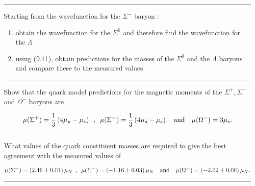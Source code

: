 \noindent\rule{7in}{1.5pt}


\begin{problem}{9.8}
Starting from the wavefunction for the $\Sigma^-$ baryon :

\begin{enumerate}[label=(\alph*)]
    \item obtain the wavefunction for the $\Sigma^0$ and therefore find the wavefunction for the $\Lambda$
    \item using (9.41), obtain predictions for the masses of the $\Sigma^0$ and the $\Lambda$ baryons and compare these to the measured values.
\end{enumerate}
\end{problem}
\begin{solution}

\end{solution}

\noindent\rule{7in}{1.5pt}


\begin{problem}{9.9}
Show that the quark model predictions for the magnetic moments of the $\Sigma^+,\Sigma^-$ and $\Omega^-$ baryons are

\begin{align*}
    \mu(\Sigma^+) = \frac{1}{3} \left( 4\mu_u - \mu_s \right) \hskip0.5em\relax , \hskip0.5em\relax \mu(\Sigma^-) = \frac{1}{3} \left( 4\mu_d - \mu_s \right) \quad \text{and} \quad \mu(\Omega^-) = 3\mu_s .
\end{align*}\\
What values of the quark constituent masses are required to give the best agreement with the measured values of

\begin{align*}
    \mu(\Sigma^+) = \left( 2.46 \pm 0.01 \right) \mu_N  \hskip0.5em\relax , \hskip0.5em\relax \mu(\Sigma^-) = \left( -1.16 \pm 0.03 \right) \mu_N \quad \text{and} \quad \mu(\Omega^-) = \left( -2.02 \pm 0.06 \right)  \mu_N .
\end{align*}
\end{problem}
\begin{solution}

\end{solution}

\noindent\rule{7in}{1.5pt}

